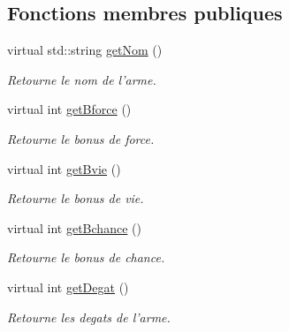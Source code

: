 \subsection*{Fonctions membres publiques}
\begin{DoxyCompactItemize}
\item 
virtual std\-::string \hyperlink{class_arme_ab1b18cfa41fac19fccedf2165b9ff33c}{get\-Nom} ()
\begin{DoxyCompactList}\small\item\em Retourne le nom de l'arme. \end{DoxyCompactList}\item 
virtual int \hyperlink{class_arme_a3939e914a9ccc898de76db26bc8c24e7}{get\-Bforce} ()
\begin{DoxyCompactList}\small\item\em Retourne le bonus de force. \end{DoxyCompactList}\item 
virtual int \hyperlink{class_arme_a479453fea0d6789e34ccaf193b3098ce}{get\-Bvie} ()
\begin{DoxyCompactList}\small\item\em Retourne le bonus de vie. \end{DoxyCompactList}\item 
virtual int \hyperlink{class_arme_a6cb83d15008174152e424bebd0921069}{get\-Bchance} ()
\begin{DoxyCompactList}\small\item\em Retourne le bonus de chance. \end{DoxyCompactList}\item 
virtual int \hyperlink{class_arme_a06ced3532b0e60cc900674a94c0cf29b}{get\-Degat} ()
\begin{DoxyCompactList}\small\item\em Retourne les degats de l'arme. \end{DoxyCompactList}\end{DoxyCompactItemize}
